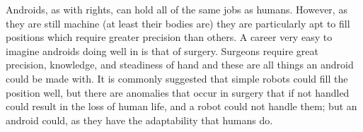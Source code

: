 Androids, as with rights, can hold all of the same jobs as humans. However, as they are still machine (at least their bodies are) they are particularly apt to fill positions which require greater precision than others. A career very easy to imagine androids doing well in is that of surgery. Surgeons require great precision, knowledge, and steadiness of hand and these are all things an android could be made with. It is commonly suggested that simple robots could fill the position well, but there are anomalies that occur in surgery that if not handled could result in the loss of human life, and a robot could not handle them; but an android could, as they have the adaptability that humans do.